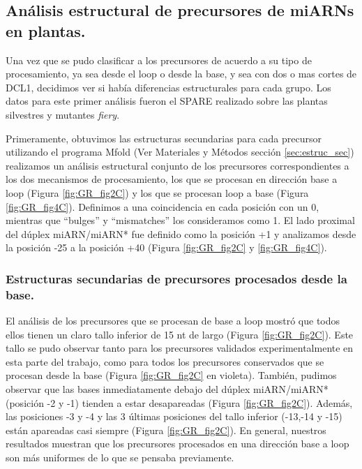 \subsection{Análisis estructural de precursores de miARNs en plantas.}

Una vez que se pudo clasificar a los precursores de acuerdo a su tipo de procesamiento, ya sea desde el loop o desde la base, y sea con dos o mas cortes de DCL1, decidimos ver si había diferencias estructurales para cada grupo.
Los datos para este primer análisis fueron el SPARE realizado sobre las plantas silvestres y mutantes \textit{fiery}.

Primeramente, obtuvimos las estructuras secundarias para cada precursor  utilizando el programa Mfold\citep{pmid12824337} (Ver Materiales y Métodos sección \ref{sec:estruc_sec}) realizamos un análisis estructural conjunto de los precursores correspondientes a los dos mecanismos de procesamiento, los que se procesan en dirección base a loop (Figura \ref{fig:GR_fig2C}) y los que se procesan loop a base (Figura \ref{fig:GR_fig4C}).
Definimos a una coincidencia en cada posición con un 0, mientras que ``bulges'' y ``mismatches'' los consideramos como 1.
El lado proximal del dúplex miARN/miARN* fue definido como la posición +1 y analizamos desde la posición -25 a la posición +40 (Figura \ref{fig:GR_fig2C} y \ref{fig:GR_fig4C}). 

\subsubsection{Estructuras secundarias de precursores procesados desde la base.}

El análisis de los precursores que se procesan de base a loop mostró que todos ellos tienen un claro tallo inferior de 15 nt de largo (Figura \ref{fig:GR_fig2C}).
Este tallo se pudo observar tanto para los precursores validados experimentalmente en esta parte del trabajo, como para todos los precursores conservados que se procesan desde la base (Figura \ref{fig:GR_fig2C} en violeta).
También, pudimos observar que las bases inmediatamente debajo del dúplex miARN/miARN* (posición -2 y -1) tienden a estar desapareadas (Figura \ref{fig:GR_fig2C}).
Además, las posiciones -3 y -4 y las 3 últimas posiciones del tallo inferior (-13,-14 y -15) están apareadas casi siempre (Figura \ref{fig:GR_fig2C}).
En general, nuestros resultados muestran que los precursores procesados en una dirección base a loop son más uniformes de lo que se pensaba previamente.

